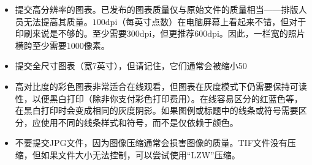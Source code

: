 \begin{itemize}
\item 提交高分辨率的图表。已发布的图表质量仅与原始文件的质量相当——排版人员无法提高其质量。$100 \mathrm{dpi}$（每英寸点数）在电脑屏幕上看起来不错，但对于印刷来说是不够的。至少需要$300 \mathrm{dpi}$，但更推荐$600 \mathrm{dpi}$。因此，一栏宽的照片横跨至少需要1000像素。
\item 提交全尺寸图表（宽7英寸），但请记住，它们通常会被缩小50%
\item 高对比度的彩色图表非常适合在线观看，但图表在灰度模式下仍需要保持可读性，以便黑白打印（除非你支付彩色打印费用）。在线容易区分的红蓝色等，在黑白打印时会变成相同的灰度阴影。如果图例或标题中的线条或符号需要区分，应使用不同的线条样式和符号，而不是仅依赖于颜色。
\item 不要提交JPG文件，因为图像压缩通常会损害图像的质量。TIF文件没有压缩，但如果文件大小无法控制，可以尝试使用“LZW”压缩。

\end{itemize}
